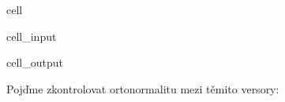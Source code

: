 \documentclass[letterpaper,10pt,english]{jupyterBook}
\begin{document}
\begin{sphinxuseclass}{cell}\begin{sphinxVerbatimInput}

\begin{sphinxuseclass}{cell_input}
\begin{sphinxVerbatim}[commandchars=\\\{\}]
        
  
\end{sphinxVerbatim}

\end{sphinxuseclass}\end{sphinxVerbatimInput}
\begin{sphinxVerbatimOutput}

\begin{sphinxuseclass}{cell_output}
\begin{sphinxVerbatim}[commandchars=\\\{\}]
[ 0.78633365 \PYGZhy{}0.61159284  0.08737041]
\end{sphinxVerbatim}

\end{sphinxuseclass}\end{sphinxVerbatimOutput}

\end{sphinxuseclass}
\sphinxAtStartPar
Pojďme zkontrolovat ortonormalitu mezi těmito versory:
\end{document}
